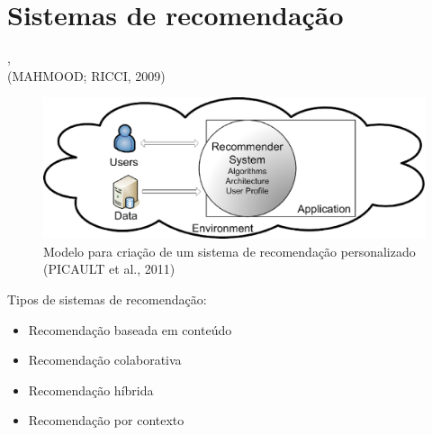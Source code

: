
\section{Sistemas de recomendação} %
\label{sec:sistemas_recomendacao}
\begin{frame}
    ,\\(MAHMOOD; RICCI, 2009)
\end{frame}

\begin{frame}

\begin{figure}[h!]
  \centering
    \includegraphics[width=1\textwidth]{figura/recommender_model.eps}
  \caption{Modelo para criação de um sistema de recomendação personalizado (PICAULT et al., 2011)}
\end{figure}

\end{frame}

\begin{frame}
    Tipos de sistemas de recomendação:

    \begin{itemize}
        \item Recomendação baseada em conteúdo
        \item Recomendação colaborativa
        \item Recomendação híbrida
        \item Recomendação por contexto
    \end{itemize}
\end{frame}

